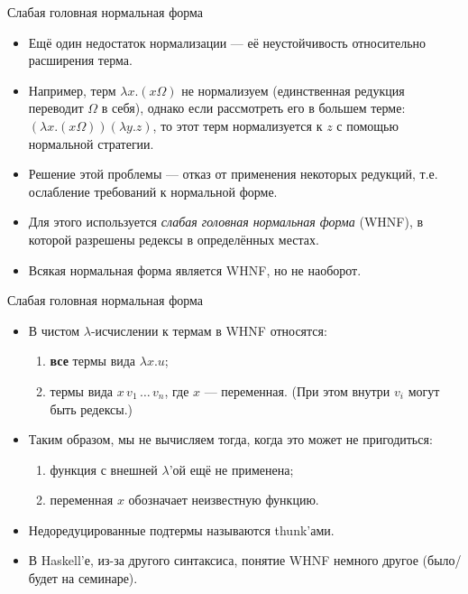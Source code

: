 \documentclass[xcolor=dvipsnames]{beamer}
\begin{document}
\begin{frame}{Слабая головная нормальная форма}

\begin{itemize}[<+->]
 \item Ещё один недостаток нормализации --- её неустойчивость относительно расширения терма.
 
 \item Например, терм $\lambda x. (x \Omega)$ не нормализуем (единственная редукция переводит $\Omega$ в себя), однако если рассмотреть его в большем терме: $(\lambda x. (x \Omega))(\lambda y.z)$, то этот терм нормализуется к $z$ с помощью нормальной стратегии.
 
 \item Решение этой проблемы --- отказ от применения некоторых редукций, т.е. ослабление требований к нормальной форме.
 
 \item Для этого используется {\em слабая головная нормальная форма} (WHNF), в которой разрешены редексы в определённых местах.
 
 \item Всякая нормальная форма является WHNF, но не наоборот.
\end{itemize}

 
 
\end{frame}

\begin{frame}{Слабая головная нормальная форма}

\begin{itemize}[<+->]
 \item В чистом $\lambda$-исчислении к термам в WHNF относятся:
 \begin{enumerate}
  \item {\bf все} термы вида $\lambda x . u$;
  \item термы вида $x \, v_1 \, \ldots \, v_n$, где $x$ --- переменная. (При этом внутри $v_i$ могут быть редексы.)
 \end{enumerate}
 \item Таким образом, мы не вычисляем тогда, когда это может не пригодиться:
 \begin{enumerate}
  \item функция с внешней $\lambda$'ой ещё не применена;
  \item переменная $x$ обозначает неизвестную функцию.
 \end{enumerate}
 \item Недоредуцированные подтермы называются thunk'ами.
 \item В Haskell'е, из-за другого синтаксиса, понятие WHNF немного другое (было/будет на семинаре).

\end{itemize}

 
\end{frame}
\end{document}
